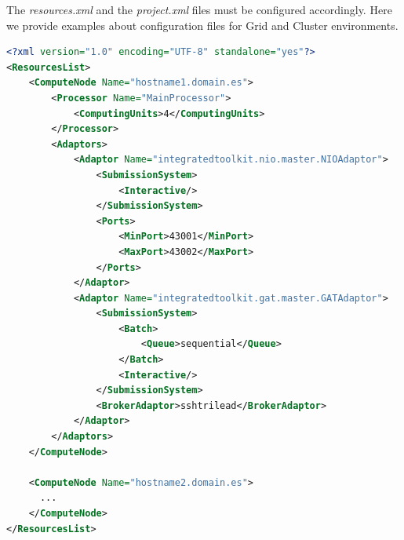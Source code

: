 The \textit{resources.xml} and the \textit{project.xml} files must be configured accordingly.
Here we provide examples about configuration files for Grid and Cluster environments.

\begin{lstlisting}[language=xml]
<?xml version="1.0" encoding="UTF-8" standalone="yes"?>                                                                                                                                                            
<ResourcesList>                                                                                                                                                                                                    
    <ComputeNode Name="hostname1.domain.es">                                                                                                                                                                       
        <Processor Name="MainProcessor">                                                                                                                                                                           
            <ComputingUnits>4</ComputingUnits>                                                                                                                                                                     
        </Processor>                                                                                                                                                                                               
        <Adaptors>                                                                                                                                                                                                 
            <Adaptor Name="integratedtoolkit.nio.master.NIOAdaptor">                                                                                                                                               
                <SubmissionSystem>
                    <Interactive/>
                </SubmissionSystem>
                <Ports>
                    <MinPort>43001</MinPort>
                    <MaxPort>43002</MaxPort>
                </Ports>
            </Adaptor>
            <Adaptor Name="integratedtoolkit.gat.master.GATAdaptor">
                <SubmissionSystem>
                    <Batch>
                        <Queue>sequential</Queue>
                    </Batch>
                    <Interactive/>
                </SubmissionSystem>
                <BrokerAdaptor>sshtrilead</BrokerAdaptor>
            </Adaptor>
        </Adaptors>
    </ComputeNode>
    
    <ComputeNode Name="hostname2.domain.es">
      ...
    </ComputeNode>
</ResourcesList>
\end{lstlisting}

